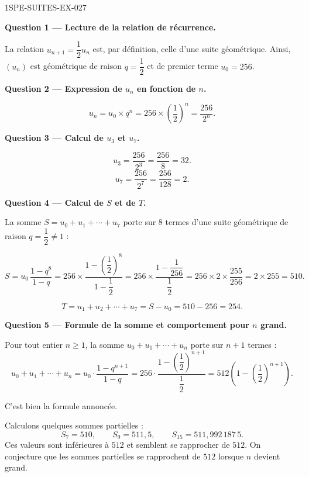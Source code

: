 \begin{corrige}{1SPE-SUITES-EX-027}

\textbf{Question 1 — Lecture de la relation de récurrence.}

La relation $u_{n+1}=\dfrac{1}{2}u_n$ est, par définition, celle d'une suite géométrique. Ainsi, $(u_n)$ est géométrique de raison $q=\dfrac{1}{2}$ et de premier terme $u_0=256$.


\medskip
\textbf{Question 2 — Expression de $u_n$ en fonction de $n$.}

\[
  u_n = u_0 \times q^n = 256 \times \left(\frac{1}{2}\right)^n = \frac{256}{2^n}.
\]

\medskip
\textbf{Question 3 — Calcul de $u_3$ et $u_7$.}

\[
  u_3 = \frac{256}{2^3} = \frac{256}{8} = 32.
\]
\[
  u_7 = \frac{256}{2^7} = \frac{256}{128} = 2.
\]

\medskip
\textbf{Question 4 — Calcul de $S$ et de $T$.}

La somme $S = u_0 + u_1 + \cdots + u_7$ porte sur $8$ termes d'une suite géométrique de raison $q = \dfrac{1}{2}
\neq 1$ :


\[
  S = u_0 \, \frac{1 - q^{8}}{1 - q} = 256 \times \frac{1 - \left(\dfrac{1}{2}\right)^8}{1 - \dfrac{1}{2}} = 256 \times \frac{1 - \dfrac{1}{256}}{\dfrac{1}{2}} = 256 \times 2 \times \frac{255}{256} = 2 \times 255 = 510.
\]

\[
  T = u_1 + u_2 + \cdots + u_7 = S - u_0 = 510 - 256 = 254.
\]

\medskip
\textbf{Question 5 — Formule de la somme et comportement pour $n$ grand.}

Pour tout entier $n \geq 1$, la somme $u_0 + u_1 + \cdots + u_n$ porte sur $n+1$ termes :
\[
  u_0 + u_1 + \cdots + u_n = u_0 \cdot \frac{1 - q^{n+1}}{1 - q} = 256 \cdot \frac{1 - \left(\dfrac{1}{2}\right)^{n+1}}{\dfrac{1}{2}} = 512 \left(1 - \left(\frac{1}{2}\right)^{n+1}\right).
\]


C'est bien la formule annoncée.

Calculons quelques sommes partielles :
\[
  S_7=510,\qquad S_9=511{,}5,\qquad S_{15}=511{,}992\,187\,5.
\]
Ces valeurs sont inférieures à $512$ et semblent se rapprocher de $512$.
On conjecture que les sommes partielles se rapprochent de $512$ lorsque $n$ devient grand.

\end{corrige}
